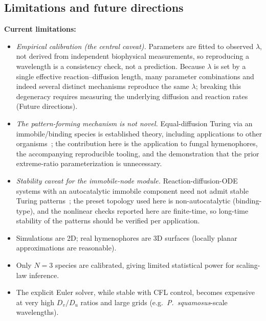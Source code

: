 \documentclass[review,3p]{elsarticle}
\begin{document}
\subsection{Limitations and future directions}

\textbf{Current limitations:}
\begin{itemize}
  \item \emph{Empirical calibration (the central caveat).} Parameters are
    fitted to observed $\lambda$, not derived from independent biophysical
    measurements, so reproducing a wavelength is a consistency check, not a
    prediction. Because $\lambda$ is set by a single effective
    reaction--diffusion length, many parameter combinations and indeed
    several distinct mechanisms reproduce the same $\lambda$; breaking this
    degeneracy requires measuring the underlying diffusion and reaction
    rates (Future directions).
  \item \emph{The pattern-forming mechanism is not novel.} Equal-diffusion
    Turing via an immobile/binding species is established theory, including
    applications to other organisms~\cite{korvasova2015,nesterenko2017,marcon2016,raspopovic2014};
    the contribution here is the application to fungal hymenophores, the
    accompanying reproducible tooling, and the demonstration that the prior
    extreme-ratio parameterization is unnecessary.
  \item \emph{Stability caveat for the immobile-node module.}
    Reaction-diffusion-ODE systems with an autocatalytic immobile component
    need not admit stable Turing patterns~\cite{marciniakczochra2016}; the
    preset topology used here is non-autocatalytic (binding-type), and the
    nonlinear checks reported here are finite-time, so long-time stability of
    the patterns should be verified per application.
  \item Simulations are 2D; real hymenophores are 3D surfaces
    (locally planar approximations are reasonable).
  \item Only $N = 3$ species are calibrated, giving limited statistical
    power for scaling-law inference.
  \item The explicit Euler solver, while stable with CFL control, becomes
    expensive at very high $D_v/D_u$ ratios and large grids
    (e.g.\ \textit{P.~squamosus}-scale wavelengths).
\end{itemize}
\end{document}
